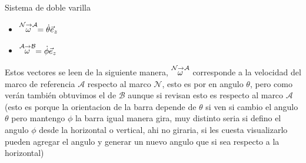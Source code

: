 \begin{solucion}{Sistema de doble varilla}
        \begin{itemize}
            \item $\stackrel{\mathcal{N} \to \mathcal{A}}{\omega}=\dot \theta\vec{e}_z$
            \item $\stackrel{\mathcal{A} \to \mathcal{B}}{\omega}=\dot \phi\vec{e}_z$
        \end{itemize}
Estos vectores se leen de la siguiente manera, $\stackrel{\mathcal{N} \to \mathcal{A}}{\omega}$ corresponde a la velocidad del marco de referencia $\mathcal{A}$ respecto al marco $\mathcal{N}$, esto es por en angulo $\theta$, pero como verán también obtuvimos el de $\mathcal{B}$ aunque si revisan esto es respecto al marco $\mathcal{A}$ (esto es porque la orientacion de la barra depende de $\theta$ si ven si cambio el angulo $\theta$ pero mantengo $\phi$ la barra igual manera gira, muy distinto seria si defino el angulo $\phi$ desde la horizontal o vertical, ahi no giraria, si les cuesta visualizarlo pueden agregar el angulo y generar un nuevo angulo que si sea respecto a la horizontal)
    \begin{center}
    
\end{center}
\end{solucion}
